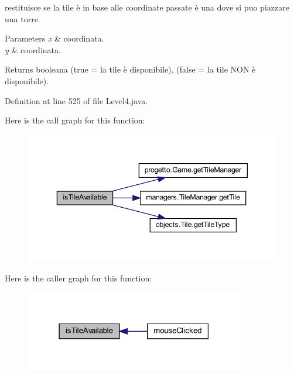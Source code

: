 restituisce se la tile è in base alle coordinate passate è una dove si puo piazzare una torre. 


\begin{DoxyParams}{Parameters}
{\em x} & coordinata. \\
\hline
{\em y} & coordinata.\\
\hline
\end{DoxyParams}
\begin{DoxyReturn}{Returns}
booleana (true = la tile è disponibile), (false = la tile N\+ON è disponibile). 
\end{DoxyReturn}


Definition at line 525 of file Level4.\+java.

Here is the call graph for this function\+:
\nopagebreak
\begin{figure}[H]
\begin{center}
\leavevmode
\includegraphics[width=343pt]{classscenes_1_1_level4_aaeac2ee6b3a920a21928ee7b3dc8e7a9_cgraph}
\end{center}
\end{figure}
Here is the caller graph for this function\+:\nopagebreak
\begin{figure}[H]
\begin{center}
\leavevmode
\includegraphics[width=271pt]{classscenes_1_1_level4_aaeac2ee6b3a920a21928ee7b3dc8e7a9_icgraph}
\end{center}
\end{figure}
\mbox{\label{classscenes_1_1_level4_ab68417e6738c05037923f5f0f21eb586}} 
